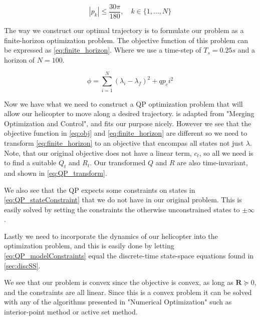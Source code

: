 \begin{equation}\label{eq:pitch_constraint}
    |p_k| \leq \frac{30\pi}{180},\quad k\in\{1,...,N\}
\end{equation}

The way we construct our optimal trajectory is to formulate our problem as a finite-horizon optimization problem. The objective function of this problem can be expressed as \cref{eq:finite_horizon}. Where we use a time-step of $T_s = 0.25s$ and a horizon of $N=100$.

\begin{equation}\label{eq:finite_horizon}
    \phi = \sum_{i=1}^{N} (\lambda_i - \lambda_f)^2 + qp_ci^2
\end{equation}

Now we have what we need to construct a QP optimization problem that will allow our helicopter to move along a desired trajectory.  is adapted from "Merging Optimization and Control"\cite{MergingOptCtr}, and fits our purpose nicely. However we see that the objective function in \cref{eq:obj} and \cref{eq:finite_horizon} are different so we need to transform \cref{eq:finite_horizon} to an objective that encompas all states not just $\lambda$. Note, that our original objective does not have a linear term, $c_t$, so all we need is to find a suitable $Q_t$ and $R_t$. Our transformed $Q$ and $R$ are also time-invariant, and shown in \cref{eq:QP_transform}.

We also see that the QP expects some constraints on states in \cref{eq:QP_stateConstraint} that we do not have in our original problem. This is easily solved by setting the constraints the otherwise unconstrained states to $\pm\infty$.

Lastly we need to incorporate the dynamics of our helicopter into the optimization problem, and this is easily done by letting \cref{eq:QP_modelConstraints} equal the discrete-time state-space equations found in \cref{sec:discSS}.

We see that our problem is convex since the objective is convex, as long as $\mathbf{R}\succeq0$, and the constraints are all linear. Since this is a convex problem it can be solved with any of the algorithms presented in "Numerical Optimization"\cite{optNW} such as interior-point method or active set method.


